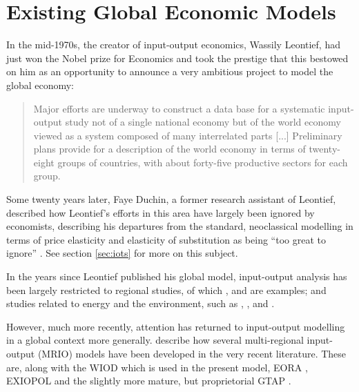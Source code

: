 \documentclass[a4paper]{article}
\begin{document}
\section{Existing Global Economic Models} \label{sec:litreview}
In the mid-1970s, the creator of input-output economics, Wassily Leontief, had just won the Nobel prize for Economics and took the prestige that this bestowed on him as an opportunity to announce a very ambitious project to model the global economy:

\begin{quotation}
Major efforts are underway to construct a data base for a systematic input-output study not of a single national economy but of the world economy viewed as a system composed of many interrelated parts [...]
Preliminary plans provide for a description of the world economy in terms of twenty-eight groups of countries, with about forty-five productive sectors for each group. 
\end{quotation}

Some twenty years later, Faye Duchin, a former research assistant of Leontief, described how Leontief's efforts in this area have largely been ignored by economists, describing his departures from the standard, neoclassical modelling in terms of price elasticity and elasticity of substitution as being ``too great to ignore'' \parencite{duchin_international_2004}. 
See section \ref{sec:iots} for more on this subject.

In the years since Leontief published his global model, input-output analysis has been largely restricted to regional studies, of which \textcite{akita_interregional_1993}, \textcite{khan_sectoral_1999} and \textcite{luo_power--pull_2013} are examples; and studies related to energy and the environment, such as  \textcite{leontief_environmental_1970}, \textcite{joshi_product_1999}, \textcite{bergh_handbook_2002} and \textcite{hendrickson_environmental_2006}.

However, much more recently, attention has returned to input-output modelling in a global context more generally. \textcite{tukker_global_2013} describe how several multi-regional input-output (MRIO) models have been developed in the very recent literature.
These are, along with the WIOD which is used in the present model, EORA \parencite{lenzen_building_2013}, EXIOPOL \parencite{tukker_exiopol_2013} and the slightly more mature, but proprietorial GTAP \parencite{walmsley_introduction_2012}.
\end{document}
